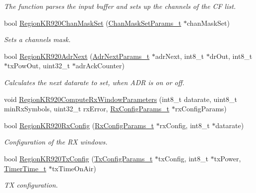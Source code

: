 \begin{DoxyCompactItemize}
\begin{DoxyCompactList}\small\item\em The function parses the input buffer and sets up the channels of the CF list. \end{DoxyCompactList}\item 
bool \hyperlink{group__REGIONKR920_gaf936d129f52abf7d56602258dece3f9f}{Region\+K\+R920\+Chan\+Mask\+Set} (\hyperlink{group__REGION_ga6d24f7da136006410827dfb29f6b9b9e}{Chan\+Mask\+Set\+Params\+\_\+t} $\ast$chan\+Mask\+Set)
\begin{DoxyCompactList}\small\item\em Sets a channels mask. \end{DoxyCompactList}\item 
bool \hyperlink{group__REGIONKR920_gaf2fd635d699d384cf9e4342a583c5b8d}{Region\+K\+R920\+Adr\+Next} (\hyperlink{group__REGION_ga567c2742622326b350b4e91bbf61b4ce}{Adr\+Next\+Params\+\_\+t} $\ast$adr\+Next, int8\+\_\+t $\ast$dr\+Out, int8\+\_\+t $\ast$tx\+Pow\+Out, uint32\+\_\+t $\ast$adr\+Ack\+Counter)
\begin{DoxyCompactList}\small\item\em Calculates the next datarate to set, when A\+DR is on or off. \end{DoxyCompactList}\item 
void \hyperlink{group__REGIONKR920_ga051e60df35d85cbf2e4089bbd8fd6290}{Region\+K\+R920\+Compute\+Rx\+Window\+Parameters} (int8\+\_\+t datarate, uint8\+\_\+t min\+Rx\+Symbols, uint32\+\_\+t rx\+Error, \hyperlink{group__REGION_ga375c038078dfcfc7ef14280021db719e}{Rx\+Config\+Params\+\_\+t} $\ast$rx\+Config\+Params)
\item 
bool \hyperlink{group__REGIONKR920_gaef3bb50f109ca60815986e3559a32acc}{Region\+K\+R920\+Rx\+Config} (\hyperlink{group__REGION_ga375c038078dfcfc7ef14280021db719e}{Rx\+Config\+Params\+\_\+t} $\ast$rx\+Config, int8\+\_\+t $\ast$datarate)
\begin{DoxyCompactList}\small\item\em Configuration of the RX windows. \end{DoxyCompactList}\item 
bool \hyperlink{group__REGIONKR920_gaa6c50a19f3f9238b8e296d74295059e3}{Region\+K\+R920\+Tx\+Config} (\hyperlink{group__REGION_gabed730d4d04b0b60d4b6d1966d3f21d3}{Tx\+Config\+Params\+\_\+t} $\ast$tx\+Config, int8\+\_\+t $\ast$tx\+Power, \hyperlink{utilities_8h_a4215ca43d3e953099ea758ce428599d0}{Timer\+Time\+\_\+t} $\ast$tx\+Time\+On\+Air)
\begin{DoxyCompactList}\small\item\em TX configuration. \end{DoxyCompactList}\item 

\end{DoxyCompactItemize}
